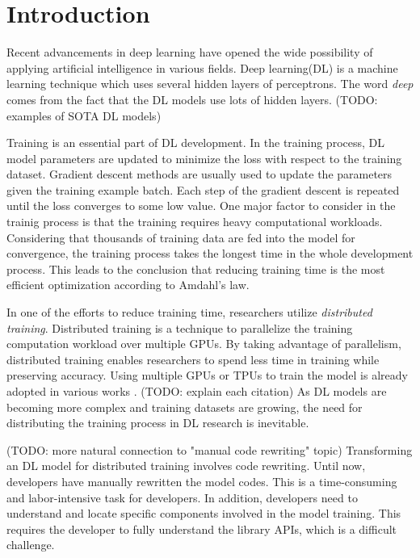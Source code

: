 \section{Introduction}\label{sec:intro}

Recent advancements in deep learning have opened the wide possibility of
applying artificial intelligence in various fields.
Deep learning(DL) is a machine learning technique which uses
several hidden layers of perceptrons.
The word \textit{deep} comes from the fact that the DL models use
lots of hidden layers.
(TODO: examples of SOTA DL models)

Training is an essential part of DL development.
In the training process, DL model parameters are updated to
minimize the loss with respect to the training dataset.
Gradient descent methods are usually used to update the
parameters given the training example batch.
Each step of the gradient descent is repeated until
the loss converges to some low value.
One major factor to consider in the trainig process is that
the training requires heavy computational workloads.
Considering that thousands of training data are fed into the model
for convergence, the training process takes the longest time
in the whole development process. This leads to the conclusion that
reducing training time is the most efficient optimization according to
Amdahl's law.

In one of the efforts to reduce training time, 
researchers utilize \textit{distributed training}.
Distributed training is a technique to parallelize the training computation
workload over multiple GPUs.
By taking advantage of parallelism, distributed training enables researchers
to spend less time in training while preserving accuracy.
Using multiple GPUs or TPUs to train the model is already adopted
in various works \cite{brown2020gpt-3} \cite{silver2017alphazero}
\cite{zhang2019distrspeech} \cite{tian2020distrwebattack}.
(TODO: explain each citation)
As DL models are becoming more complex and training datasets are growing,
the need for distributing the training process in DL research is inevitable.

(TODO: more natural connection to "manual code rewriting" topic)
Transforming an DL model for distributed training involves code rewriting.
Until now, developers have manually rewritten the model codes.
This is a time-consuming and labor-intensive task for developers.
In addition, developers need to understand and locate 
specific components involved in the model training.
This requires the developer to fully understand the library APIs,
which is a difficult challenge.


